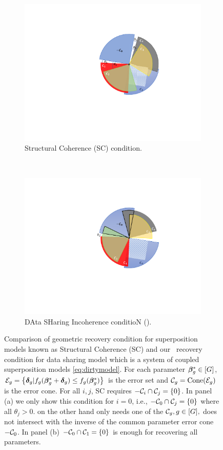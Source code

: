 \begin{figure}[t!]
	\centering
	\begin{subfigure}[t]{0.47\textwidth}
		\includegraphics[width=\textwidth]{./img/sc.pdf}
		\caption{Structural Coherence (SC) condition.}\label{fig:sc}
	\end{subfigure} 
	~
	\begin{subfigure}[t]{0.48\textwidth}
		\includegraphics[width=\textwidth]{./img/deric.pdf}
		\caption{DAta SHaring Incoherence conditioN (\ds).}
		\label{fig:DASHIN}
	\end{subfigure}
	\squeezeup
	\caption{Comparison of geometric recovery condition for superposition models known as Structural Coherence (SC) \cite{guba16} and our \ds\ recovery condition for data sharing model which is a system of coupled superposition models \eqref{eq:dirtymodel}. For each parameter $\boldsymbol{\beta}^*_g \in [G]$, $\cE_g = \left\{\ddelta_g | f_g(\bbeta _g^* + \ddelta_g) \leq f_g(\bbeta _g^*)\right\}$ is the error set and $\cC_g = \text{Cone}(\cE_g)$ is the error cone. For all $i,j$, SC requires $-\cC_i \cap \cC_j = \{0\}$. In panel (a) we only show this condition for $i = 0$, i.e., $-\cC_0 \cap \cC_j = \{0\}$ where all $\theta_j > 0$. \ds on the other hand only needs one of the $\cC_g, g \in [G],$ does not intersect with the inverse of the common parameter error cone $-\cC_0$. In panel (b) $-\cC_0 \cap \cC_1 = \{0\}$ is enough for recovering all parameters.}
	\label{fig syn2}
\end{figure}

